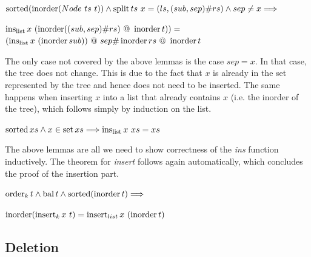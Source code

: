 \begin{lemma}
    $\operatorname{sorted} (\operatorname{inorder} (Node\ ts\ t)) \wedge \operatorname{split} ts\ x = (ls, (sub,sep)\#rs) \wedge sep \neq x \Longrightarrow$ \\
    \begin{center}
    $\inslist x\ (\inorder ((sub,sep)\#rs)\ @\ \inorder t)) =$\\
    $ (\operatorname{ins_{list}} x\ (\operatorname{inorder} sub))\ @\ sep \# \operatorname{inorder} rs\ @\ \operatorname{inorder} t$
    \end{center}
\end{lemma}

The only case not covered by the above lemmas is the case $sep = x$.
In that case, the tree does not change.
This is due to the fact that $x$ is already in the set represented by the tree
and hence does not need to be inserted.
The same happens when inserting $x$ into a list that already contains $x$
(i.e. the inorder of the tree),
which follows simply by induction on the list.

\begin{lemma}
    $\operatorname{sorted} xs \wedge x \in \operatorname{set} xs \Longrightarrow \operatorname{ins_{list}} x\ xs = xs$
\end{lemma}

The above lemmas are all we need to show correctness
of the \textit{ins} function inductively.
The theorem for \textit{insert} follows again automatically,
which concludes the proof of the insertion part.

\begin{theorem}
    \label{thm:ins-set}
    $\operatorname{order}_k t \wedge \operatorname{bal} t \wedge \operatorname{sorted}  (\operatorname{inorder} t)\Longrightarrow$\\
    \begin{center}
    $\operatorname{inorder} (\operatorname{insert}_k x\ t) = \operatorname{insert}_{list} x\ (\operatorname{inorder} t)$
    \end{center}
\end{theorem}


\subsection{Deletion}


